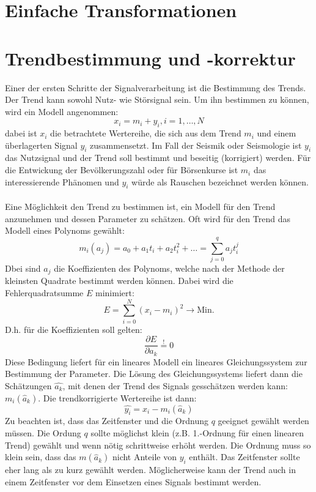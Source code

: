 \section{Einfache Transformationen}

\section{Trendbestimmung und -korrektur}
Einer der ersten Schritte der Signalverarbeitung ist die Bestimmung des Trends. Der Trend kann sowohl Nutz- wie Störsignal sein. Um ihn bestimmen zu können, wird ein Modell angenommen:
\[
x_i=m_i + y_i, i=1,\dots, N
\]
 dabei ist $x_i$ die betrachtete Wertereihe, die sich aus dem Trend $m_i$ und einem überlagerten Signal $y_i$ zusammensetzt. Im Fall der Seismik oder Seismologie ist ${y_i}$ das Nutzsignal und der Trend soll bestimmt und beseitig (korrigiert) werden. Für die Entwickung der Bevölkerungszahl oder für Börsenkurse ist ${m_i}$ das interessierende Phänomen und ${y_i}$ würde als Rauschen bezeichnet werden können.\\\\
Eine Möglichkeit den Trend zu bestimmen ist, ein Modell für den Trend anzunehmen und dessen Parameter zu schätzen. Oft wird für den Trend das Modell eines Polynoms gewählt:
\[
m_i(a_j)=a_0+ a_1t_i+a_2t_i^2+\dots = \sum\limits_{j=0}^{q} a_j t_i^j
\]
Dbei sind ${a_j}$ die Koeffizienten des Polynoms, welche nach der Methode der kleinsten Quadrate bestimmt werden können. Dabei wird die Fehlerquadratsumme $E$ minimiert:
\[
E=\sum\limits_{i=0}^N (x_i -m_i)^2 \rightarrow \mbox{Min.}
\]
D.h. für die Koeffizienten soll gelten:
\[
\frac{\partial E}{\partial a_k}\stackrel{!}{=}0
\]
Diese Bedingung liefert für ein lineares Modell ein lineares Gleichungssystem zur Bestimmung der Parameter. Die Lösung des Gleichungssystems liefert dann die Schätzungen $\hat{a_k}$, mit denen der Trend des Signals gesschätzen werden kann: $m_i(\hat a_k)$. Die trendkorrigierte Wertereihe ist dann:
\[
\hat{y_i}=x_i-m_i(\hat a_k)
\]
Zu beachten ist, dass das Zeitfenster und die Ordnung $q$ geeignet gewählt werden müssen. Die Ordung $q$ sollte möglichst klein (z.B. 1.-Ordnung für einen linearen Trend) gewählt und wenn nötig schrittweise erhöht werden. Die Ordnung muss so klein sein, dass das $m(\hat a_k)$ nicht Anteile von ${y_i}$ enthält. Das Zeitfenster sollte eher lang als zu kurz gewählt werden. Möglicherweise kann der Trend auch in einem Zeitfenster vor dem Einsetzen eines Signals bestimmt werden.\\\\

